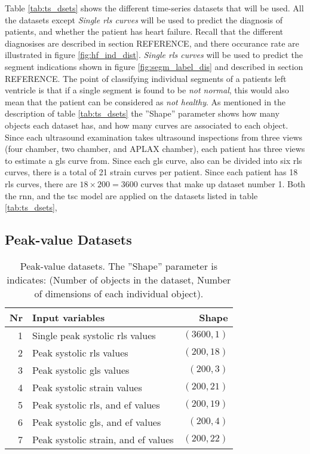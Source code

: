 Table \ref{tab:ts_dsets} shows the different time-series datasets that will be used. 
All the datasets except \textit{Single \acrshort{rls} curves} will be used to predict the diagnosis of patients, and whether the patient has heart failure.
Recall that the different diagnosises are described in section REFERENCE, and there occurance rate are illustrated in figure \ref{fig:hf_ind_dist}.
\textit{Single \acrshort{rls} curves} will be used to predict the segment indications shown in figure \ref{fig:segm_label_dis} and described in section REFERENCE. 
The point of classifying individual segments of a patients left ventricle is that if a single segment is found to be \textit{not normal}, 
this would also mean that the patient can be considered as \textit{not healthy}.
As mentioned in the description of table \ref{tab:ts_dsets} the ''Shape'' parameter shows how many objects each dataset has, and how many curves are associated to each object. 
Since each ultrasound examination takes ultrasound inspections from three views (four chamber, two chamber, and APLAX chamber), each patient has three views to estimate a \acrshort{gls} curve from. 
Since each \acrshort{gls} curve, also can be divided into six \acrshort{rls} curves, there is a total of 21 strain curves per patient. 
Since each patient has 18 \acrshort{rls} curves, there are $18 \times 200 = 3600$ curves that make up dataset number 1.
Both the \acrshort{rnn}, and the \acrshort{tsc} model are applied on the datasets listed in table \ref{tab:ts_dsets}, 
\bigskip

\subsection{Peak-value Datasets}

\begin{table*}[h]
    \centering
    \begin{tabular}{ rlr }
        \toprule
        Nr & Input variables                     & Shape \\
        \midrule                              
        1  & Single peak systolic \acrshort{rls} values                & $(3600,1)$ \\
        2  & Peak systolic \acrshort{rls} values                       & $(200,18)$ \\
        3  & Peak systolic \acrshort{gls} values                       & $(200,3)$  \\
        4  & Peak systolic strain values                               & $(200,21)$ \\
        5  & Peak systolic \acrshort{rls}, and \acrshort{ef} values    & $(200,19)$ \\
        6  & Peak systolic \acrshort{gls}, and \acrshort{ef} values    & $(200,4)$  \\
        7  & Peak systolic strain, and \acrshort{ef} values            & $(200,22)$ \\
        \bottomrule
    \end{tabular}
    \caption{Peak-value datasets. The ''Shape'' parameter is indicates: (Number of objects in the dataset, Number of dimensions of each individual object).}
    \label{tab:pv_dsets}
\end{table*}

